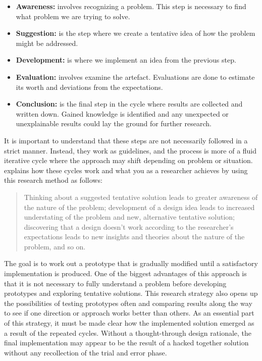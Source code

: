 \begin{itemize}
    \item\textbf{Awareness:} involves recognizing a problem. This step is necessary to find what problem we are trying to solve.
    \item\textbf{Suggestion:} is the step where we create a tentative idea of how the problem might be addressed.
    \item\textbf{Development:} is where we implement an idea from the previous step.
    \item\textbf{Evaluation:} involves examine the artefact. Evaluations are done to estimate its worth and deviations from the expectations.
    \item\textbf{Conclusion:} is the final step in the cycle where results are collected and written down. Gained knowledge is identified and any unexpected or unexplainable results could lay the ground for further research.
\end{itemize}

It is important to understand that these steps are not necessarily followed in a strict manner. Instead, they work as guidelines, and the process is more of a fluid iterative cycle where the approach may shift depending on problem or situation. \cite{oates2005researching} explains how these cycles work and what you as a researcher achieves by using this research method as follows:

\begin{quote}
    Thinking about a suggested tentative solution leads to greater awareness of the nature of the problem; development of a design idea leads to increased understating of the problem and new, alternative tentative solution; discovering that a design doesn't work according to the researcher's expectations leads to new insights and theories about the nature of the problem, and so on. 
\end{quote}

The goal is to work out a prototype that is gradually modified until a satisfactory implementation is produced. One of the biggest advantages of this approach is that it is not necessary to fully understand a problem before developing prototypes and exploring tentative solutions. This research strategy also opens up the possibilities of testing prototypes often and comparing results along the way to see if one direction or approach works better than others. As an essential part of this strategy, it must be made clear how the implemented solution emerged as a result of the repeated cycles. Without a thought-through design rationale, the final implementation may appear to be the result of a hacked together solution without any recollection of the trial and error phase.

